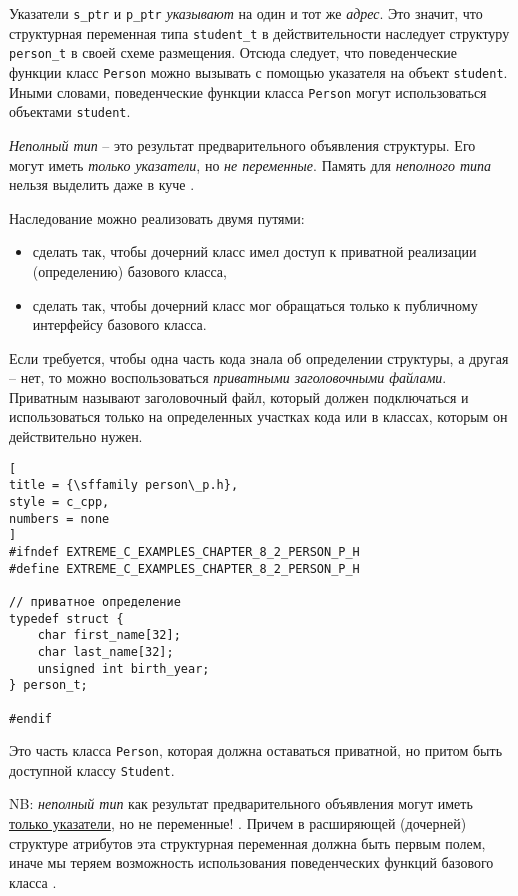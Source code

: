 \documentclass[%
	11pt,
	a4paper,
	utf8,
		]{article}
\begin{document}
Указатели \verb|s_ptr| и \verb|p_ptr| \emph{указывают} на один и тот же \emph{адрес}. Это значит, что структурная переменная типа \verb|student_t| в действительности наследует структуру \verb|person_t| в своей схеме размещения. Отсюда следует, что поведенческие функции класс \verb|Person| можно вызывать с помощью указателя на объект \verb|student|. Иными словами, поведенческие функции класса \verb|Person| могут использоваться объектами \verb|student|.

\emph{Неполный тип} -- это результат предварительного объявления структуры. Его могут иметь \emph{только указатели}, но \emph{не переменные}. {\color{red}Память для \emph{неполного типа} нельзя выделить даже в куче} \cite[]{amini-extreme-c:2022}.

Наследование можно реализовать двумя путями:
\begin{itemize}
	\item сделать так, чтобы дочерний класс имел доступ к приватной реализации (определению) базового класса,
	
	\item сделать так, чтобы дочерний класс мог обращаться только к публичному интерфейсу базового класса.
\end{itemize}

Если требуется, чтобы одна часть кода знала об определении структуры, а другая -- нет, то можно воспользоваться \emph{приватными заголовочными файлами}. Приватным называют заголовочный файл, который должен подключаться и использоваться только на определенных участках кода или в классах, которым он действительно нужен.

\begin{lstlisting}[
title = {\sffamily person\_p.h},
style = c_cpp,
numbers = none	
]
#ifndef EXTREME_C_EXAMPLES_CHAPTER_8_2_PERSON_P_H
#define EXTREME_C_EXAMPLES_CHAPTER_8_2_PERSON_P_H

// приватное определение
typedef struct {
    char first_name[32];
    char last_name[32];
    unsigned int birth_year;
} person_t;

#endif
\end{lstlisting}

Это часть класса \verb|Person|, которая должна оставаться приватной, но притом быть доступной классу \verb|Student|.

NB: \emph{неполный тип} как результат предварительного объявления могут иметь \underline{только указатели}, но не переменные! \cite[]{amini-extreme-c:2022}. Причем в расширяющей (дочерней) структуре атрибутов эта структурная переменная должна быть первым полем, иначе мы теряем возможность использования поведенческих функций базового класса \cite[]{amini-extreme-c:2022}.
\end{document}
